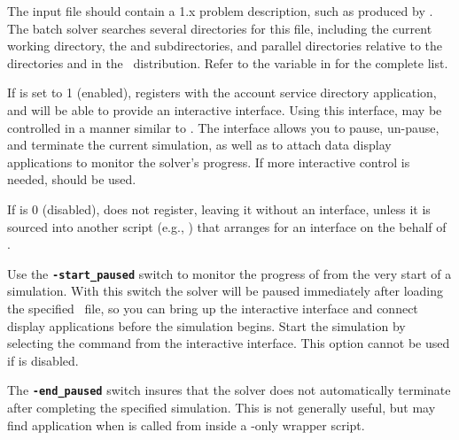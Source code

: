 The input file {\bf{}} should contain a
 1.x problem
description, such as produced by
.  The batch solver
searches several directories for this file, including the current
working directory, the  and
 subdirectories, and parallel directories relative to the
directories  and
 in the \OOMMF\ distribution.  Refer to the
 variable in  for the complete list.

If  is set to 1 (enabled),  registers
with the account service directory
application, and  will be able to provide an interactive
interface.  Using this interface,  may be controlled in
a manner similar to .  The
interface allows you to pause,
un-pause, and terminate the current
simulation, as well as to attach data display applications to monitor
the solver's progress.  If more interactive control is needed,
 should be used.

If  is 0 (disabled),  does not register,
leaving it without an interface, unless it is sourced into another
script (e.g., ) that
arranges for an interface on the behalf of .

Use the {\bf\verb|-start_paused|} switch to monitor the progress of
 from the very start of a simulation.  With this
switch the solver will be paused immediately after loading the
specified \MIF\ file, so you can bring up the interactive interface
and connect display applications before the simulation begins.  Start the
simulation by selecting the  command from the interactive
interface.  This option cannot be used if  is disabled.

The {\bf\verb|-end_paused|} switch insures that the solver does
not automatically terminate after completing the specified
simulation.  This is not generally useful, but may find application
when  is called from inside a \Tcl -only wrapper
script.

